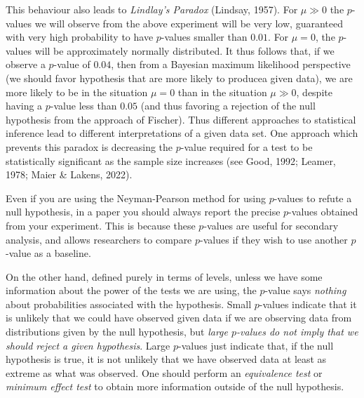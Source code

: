 This behaviour also leads to \emph{Lindlay's Paradox} (Lindsay, 1957). For $\mu \gg 0$ the $p$-values we will observe from the above experiment will be very low, guaranteed with very high probability to have $p$-values smaller than $0.01$. For $\mu = 0$, the $p$-values will be approximately normally distributed. It thus follows that, if we observe a $p$-value of $0.04$, then from a Bayesian maximum likelihood perspective (we should favor hypothesis that are more likely to producea given data), we are more likely to be in the situation $\mu = 0$ than in the situation $\mu \gg 0$, despite having a $p$-value less than $0.05$ (and thus favoring a rejection of the null hypothesis from the approach of Fischer). Thus different approaches to statistical inference lead to different interpretations of a given data set. One approach which prevents this paradox is decreasing the $p$-value required for a test to be statistically significant as the sample size increases (see Good, 1992; Leamer, 1978; Maier \& Lakens, 2022).


Even if you are using the Neyman-Pearson method for using $p$-values to refute a null hypothesis, in a paper you should always report the precise $p$-values obtained from your experiment. This is because these $p$-values are useful for secondary analysis, and allows researchers to compare $p$-values if they wish to use another $p$-value as a baseline.

On the other hand, defined purely in terms of levels, unless we have some information about the power of the tests we are using, the $p$-value says \emph{nothing} about probabilities associated with the hypothesis. Small $p$-values indicate that it is unlikely that we could have observed given data if we are observing data from distributions given by the null hypothesis, but \emph{large $p$-values do not imply that we should reject a given hypothesis}. Large $p$-values just indicate that, if the null hypothesis is true, it is not unlikely that we have observed data at least as extreme as what was observed. One should perform an \emph{equivalence test} or \emph{minimum effect test} to obtain more information outside of the null hypothesis.




